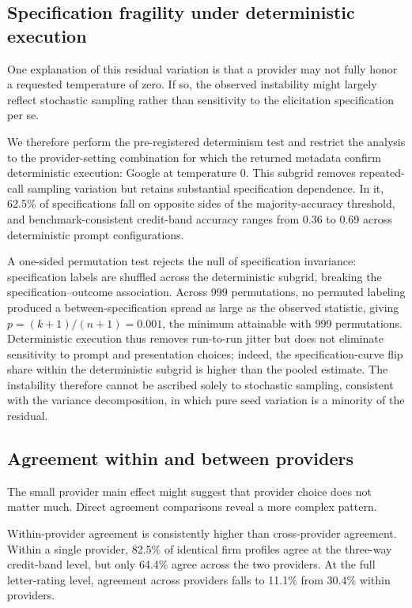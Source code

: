 \documentclass[a4paper,fleqn]{cas-sc}
\begin{document}
\subsection{Specification fragility under deterministic execution}
One explanation of this residual variation is that a provider may not fully honor a requested
temperature of zero. If so, the observed instability might largely reflect stochastic sampling rather
than sensitivity to the elicitation specification per se.

We therefore perform the pre-registered determinism test and restrict the analysis to the
provider-setting combination for which the returned metadata confirm deterministic execution: Google at
temperature 0. This subgrid removes repeated-call sampling variation but retains substantial
specification dependence. In it, 62.5\% of specifications fall on opposite sides of the majority-accuracy
threshold, and benchmark-consistent credit-band accuracy ranges from 0.36 to 0.69 across deterministic
prompt configurations.

A one-sided permutation test rejects the null of specification invariance: specification labels are
shuffled across the deterministic subgrid, breaking the specification--outcome association. Across 999
permutations, no permuted labeling produced a between-specification spread as large as the observed
statistic, giving $p=(k{+}1)/(n{+}1)=0.001$, the minimum attainable with 999 permutations. Deterministic execution thus removes run-to-run jitter but does not eliminate
sensitivity to prompt and presentation choices; indeed, the specification-curve flip share within the
deterministic subgrid is higher than the pooled estimate. The instability therefore cannot be ascribed
solely to stochastic sampling, consistent with the variance decomposition, in which pure seed variation
is a minority of the residual.

\subsection{Agreement within and between providers}
The small provider main effect might suggest that provider choice does not matter much. Direct agreement
comparisons reveal a more complex pattern.

Within-provider agreement is consistently higher than cross-provider agreement. Within a single provider,
82.5\% of identical firm profiles agree at the three-way credit-band level, but only 64.4\% agree across
the two providers. At the full letter-rating level, agreement across providers falls to 11.1\% from
30.4\% within providers.
\end{document}
